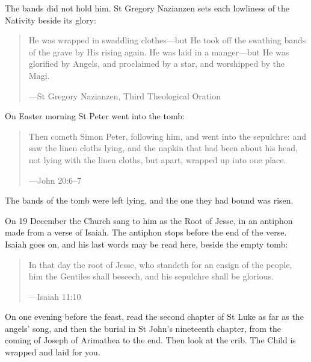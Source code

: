 The bands did not hold him. St Gregory Nazianzen sets each lowliness of the
Nativity beside its glory:

\begin{quote}
He was wrapped in swaddling clothes---but He took off the swathing bands of the
grave by His rising again. He was laid in a manger---but He was glorified by
Angels, and proclaimed by a star, and worshipped by the Magi.\par
{\smallskip\noindent\small ---St Gregory Nazianzen, Third Theological Oration\par}
\end{quote}

On Easter morning St Peter went into the tomb:

\begin{quote}
Then cometh Simon Peter, following him, and went into the sepulchre: and saw
the linen cloths lying, and the napkin that had been about his head, not lying
with the linen cloths, but apart, wrapped up into one place.\par
{\smallskip\noindent\small ---John 20:6--7\par}
\end{quote}

The bands of the tomb were left lying, and the one they had bound was risen.

On 19 December the Church sang to him as the Root of Jesse, in an antiphon made
from a verse of Isaiah. The antiphon stops before the end of the verse. Isaiah
goes on, and his last words may be read here, beside the empty tomb:

\begin{quote}
In that day the root of Jesse, who standeth for an ensign of the people, him
the Gentiles shall beseech, and his sepulchre shall be glorious.\par
{\smallskip\noindent\small ---Isaiah 11:10\par}
\end{quote}

On one evening before the feast, read the second chapter of St Luke as far as the
angels' song, and then the burial in St John's nineteenth chapter, from the
coming of Joseph of Arimathea to the end. Then look at the crib. The Child is
wrapped and laid for you.

